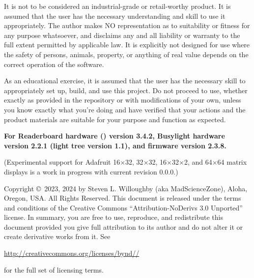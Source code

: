 It is not to be considered an industrial-grade or retail-worthy product.
It is assumed that the user has the necessary understanding and skill to use it appropriately.  The author makes NO
representation as to suitability or fitness for any purpose whatsoever, and disclaims any and all liability or 
warranty to the full extent permitted by applicable law.  It is explicitly not designed for use where the safety
of persons, animals, property, or anything of real value depends on the correct operation of the software.

As an educational exercise, it is assumed that the user has the necessary skill to appropriately set up, build,
and use this project. Do not proceed to use, whether exactly as provided in the repository or with modifications
of your own, unless you know exactly what you're doing and have verified that your actions and the product
materials are suitable for your purpose and function as expected.

\strut\vfill

\begin{center}\bfseries
	For Readerboard hardware () version 3.4.2, 
	Busylight hardware version 2.2.1 (light tree version 1.1), and firmware version 2.3.8.

	(Experimental support for Adafruit 16$\times$32, 32$\times$32, 16$\times$32$\times$2, and 64$\times$64  matrix displays is a work in progress
	with current  revision 0.0.0.)
\end{center}

\strut\vfill

\noindent Copyright \copyright\ 2023, 2024 by Steven L. Willoughby
(aka MadScienceZone), Aloha, Oregon, USA. All Rights Reserved.
This document is released under the terms and conditions of the
Creative Commons ``Attribution-NoDerivs 3.0 Unported'' license.
In summary, you are free to use, reproduce, and redistribute this 
document provided you give full attribution to its author and do not
alter it or create derivative works from it.  See
\begin{center}
\href{http://creativecommons.org/licenses/by-nd-3.0}{http://creativecommons.org/licenses/by\-nd\-//} 
\end{center}
for the full set of licensing terms.

\begin{center}
\end{center}

